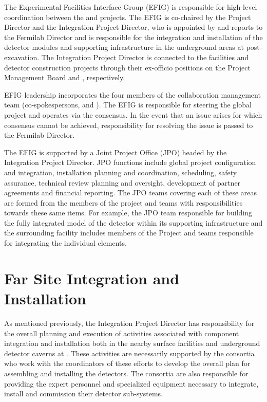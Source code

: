 The Experimental Facilities Interface Group (EFIG) is responsible for
high-level coordination between the  and 
projects.  The EFIG is co-chaired by the  Project Director and the
Integration Project Director, who is appointed by and reports to the
Fermilab Director and is responsible for the integration and
installation of the detector modules and supporting 
infrastructure in the underground areas at \surf post-excavation.  The
Integration Project Director is connected to the facilities and
detector construction projects through their ex-officio positions on
the  Project Management Board and  ,
respectively.

EFIG leadership incorporates the four members of the 
collaboration management team (co-spokespersons,  and
).  The EFIG is responsible for steering the global
project and operates via the consensus.  In the event that an issue
arises for which consensus cannot be achieved, responsibility for
resolving the issue is passed to the Fermilab Director.

The EFIG is supported by a Joint Project Office (JPO) headed by the
Integration Project Director.  JPO functions include global project
configuration and integration, installation planning and coordination,
scheduling, safety assurance, technical review planning and oversight,
development of partner agreements and financial reporting.  The JPO
teams covering each of these areas are formed from the members of the
 project and   teams with
responsibilities towards these same items.  For example, the JPO team
responsible for building the fully integrated model of the detector
within its supporting infrastructure and the surrounding facility
includes members of the  Project and  
teams responsible for integrating the individual elements.

\section{Far Site Integration and Installation}
\label{sec:far_site}

As mentioned previously, the Integration Project Director has
responsibility for the overall planning and execution of activities
associated with component integration and installation both in the
nearby surface facilities and underground detector caverns at \surf.
These activities are necessarily supported by the  consortia who
work with the coordinators of these efforts to develop the overall
plan for assembling and installing the detectors.  The consortia are
also responsible for providing the expert personnel and specialized
equipment necessary to integrate, install and commission their
detector sub-systems.

